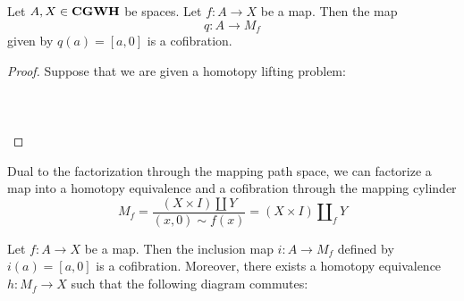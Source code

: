 \documentclass[a4paper]{article}
\begin{document}
\begin{prp}{}{} Let $A,X\in\bold{CGWH}$ be spaces. Let $f:A\to X$ be a map. Then the map $$q:A\to M_f$$ given by $q(a)=[a,0]$ is a cofibration. \tcbline
\begin{proof}
Suppose that we are given a homotopy lifting problem: \\~\\
\\~\\
\end{proof}
\end{prp}

Dual to the factorization through the mapping path space, we can factorize a map into a homotopy equivalence and a cofibration through the mapping cylinder $$M_f=\frac{(X\times I)\amalg Y}{(x,0)\sim f(x)}=(X\times I)\amalg_fY$$

\begin{thm}{}{} Let $f:A\to X$ be a map. Then the inclusion map $i:A\to M_f$ defined by $i(a)=[a,0]$ is a cofibration. Moreover, there exists a homotopy equivalence $h:M_f\to X$ such that the following diagram commutes: \\~\\
\end{thm}
\end{document}
